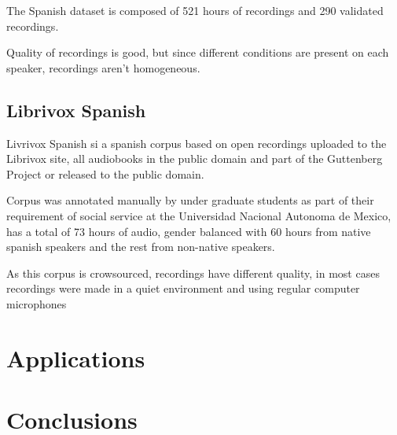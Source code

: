 \documentclass[10pt, a4paper]{article}
\begin{document}
The Spanish dataset is composed of 521 hours of recordings and 290 validated recordings.

Quality of recordings is good, but since different conditions are present on each speaker, recordings aren't homogeneous.

\subsection{Librivox Spanish}

Livrivox Spanish si a spanish corpus based on open recordings uploaded to the Librivox site, all audiobooks in the public domain and part of the Guttenberg Project or released to the public domain.

Corpus was annotated manually by under graduate students as part of their requirement of social service at the Universidad Nacional Autonoma de Mexico, has a total of 73 hours of audio, gender balanced with 60 hours from native spanish speakers
and the rest from non-native speakers.

As this corpus is crowsourced, recordings have different quality, in most cases recordings were made in a quiet environment and using regular computer microphones

\section{Applications}

\section{Conclusions}



\end{document}
